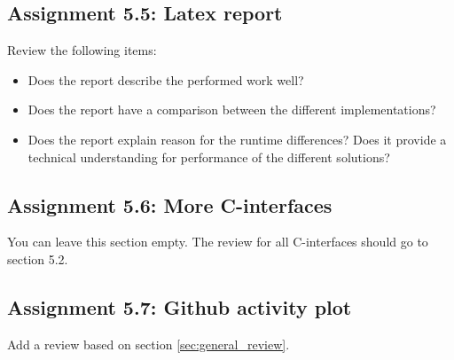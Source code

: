 \documentclass[a4paper]{article}
\begin{document}
\subsection*{Assignment 5.5: Latex report}
Review the following items: 
\begin{itemize}
\item Does the report describe the performed work well? 
\item Does the report have a comparison between the different implementations? 
\item Does the report explain reason for the runtime differences? Does it provide a technical understanding for performance of the different solutions?
\end{itemize}

\subsection*{Assignment 5.6: More C-interfaces}
You can leave this section empty. The review for all C-interfaces should go to section 5.2.

\subsection*{Assignment 5.7: Github activity plot}
Add a review based on section \ref{sec:general_review}.



\end{document}
